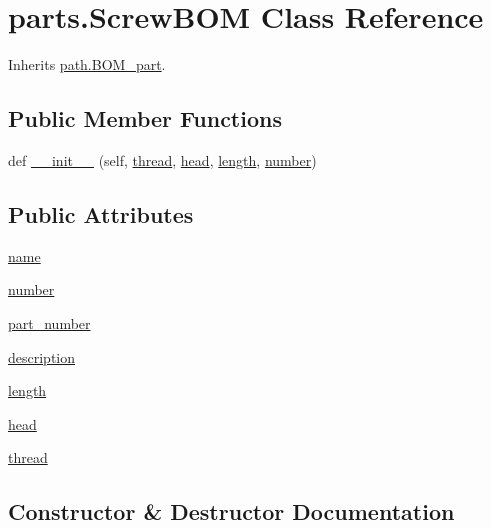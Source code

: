 \hypertarget{classparts_1_1_screw_b_o_m}{}\section{parts.\+Screw\+B\+O\+M Class Reference}
\label{classparts_1_1_screw_b_o_m}


Inherits \hyperlink{classpath_1_1_b_o_m__part}{path.\+B\+O\+M\+\_\+part}.

\subsection*{Public Member Functions}
\begin{DoxyCompactItemize}
\item 
def \hyperlink{classparts_1_1_screw_b_o_m_a2a1afdbf3e5b87a15c94c7bfed7d4693}{\+\_\+\+\_\+init\+\_\+\+\_\+} (self, \hyperlink{classparts_1_1_screw_b_o_m_a7f6d2d536640d638b0391a6b9a1002c7}{thread}, \hyperlink{classparts_1_1_screw_b_o_m_ae145cf54d25864023b5975c20a91cc95}{head}, \hyperlink{classparts_1_1_screw_b_o_m_a495faf4fe06182e68eade0fa667cbc1e}{length}, \hyperlink{classparts_1_1_screw_b_o_m_a28bae5532d3be075028dc5a687ac6fe5}{number})
\end{DoxyCompactItemize}
\subsection*{Public Attributes}
\begin{DoxyCompactItemize}
\item 
\hyperlink{classparts_1_1_screw_b_o_m_a6fdeb65838dbe1de849e62a88a9461a5}{name}
\item 
\hyperlink{classparts_1_1_screw_b_o_m_a28bae5532d3be075028dc5a687ac6fe5}{number}
\item 
\hyperlink{classparts_1_1_screw_b_o_m_a2de725e42c9c4c5303e30128778ba565}{part\+\_\+number}
\item 
\hyperlink{classparts_1_1_screw_b_o_m_ae47b602b120b6a426dad48fc4b7ac6ab}{description}
\item 
\hyperlink{classparts_1_1_screw_b_o_m_a495faf4fe06182e68eade0fa667cbc1e}{length}
\item 
\hyperlink{classparts_1_1_screw_b_o_m_ae145cf54d25864023b5975c20a91cc95}{head}
\item 
\hyperlink{classparts_1_1_screw_b_o_m_a7f6d2d536640d638b0391a6b9a1002c7}{thread}
\end{DoxyCompactItemize}


\subsection{Constructor \& Destructor Documentation}
\hypertarget{classparts_1_1_screw_b_o_m_a2a1afdbf3e5b87a15c94c7bfed7d4693}{}
